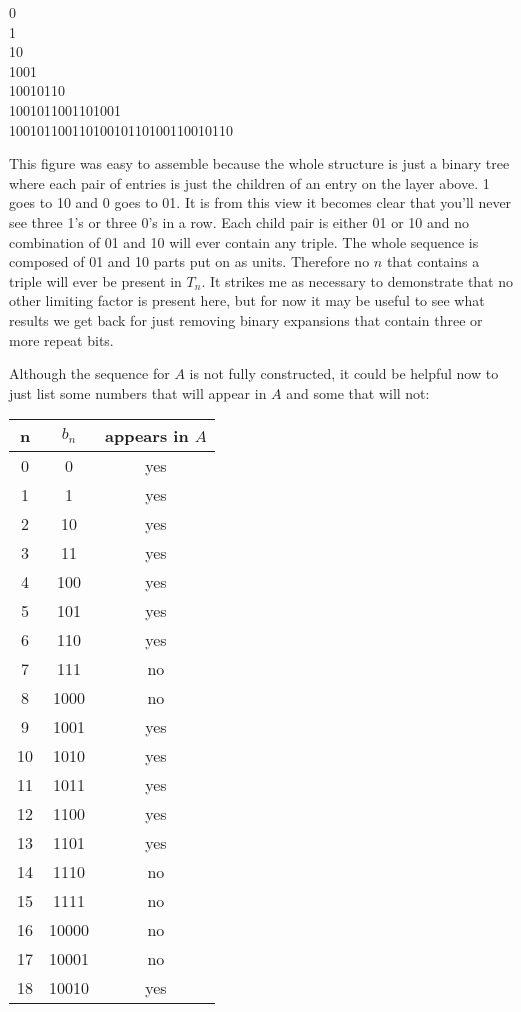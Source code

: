 \documentclass{article}
\begin{document}
\begin{center}
    0 \\
    1 \\
    10 \\
    1001 \\
    10010110 \\
    1001011001101001 \\
    10010110011010010110100110010110 \\
\end{center}

This figure was easy to assemble because the whole structure is just a binary tree where each pair of entries is just the children of an entry on the layer above.  1 goes to 10 and 0 goes to 01.  It is from this view it becomes clear that you'll never see three 1's or three 0's in a row.  Each child pair is either 01 or 10 and no combination of 01 and 10 will ever contain any triple.  The whole sequence is composed of 01 and 10 parts put on as units.  Therefore no $n$ that contains a triple will ever be present in $T_n$.  It strikes me as necessary to demonstrate that no other limiting factor is present here, but for now it may be useful to see what results we get back for just removing binary expansions that contain three or more repeat bits.

\par

Although the sequence for $A$ is not fully constructed, it could be helpful now to just list some numbers that will appear in $A$ and some that will not:

\begin{center}
    \begin{tabular}{c | c | c}
        n & $b_{n}$ & appears in $A$ \\
        \hline
        0 & 0 & yes \\
        1 & 1 & yes \\
        2 & 10 & yes \\
        3 & 11 & yes \\
        4 & 100 & yes \\
        5 & 101 & yes \\
        6 & 110 & yes \\
        7 & 111 & no \\
        8 & 1000 & no \\
        9 & 1001 & yes \\
        10 & 1010 & yes \\
        11 & 1011 & yes \\
        12 & 1100 & yes \\
        13 & 1101 & yes \\
        14 & 1110 & no \\
        15 & 1111 & no \\
        16 & 10000 & no \\
        17 & 10001 & no \\
        18 & 10010 & yes \\
    \end{tabular}
\end{center}
\end{document}
